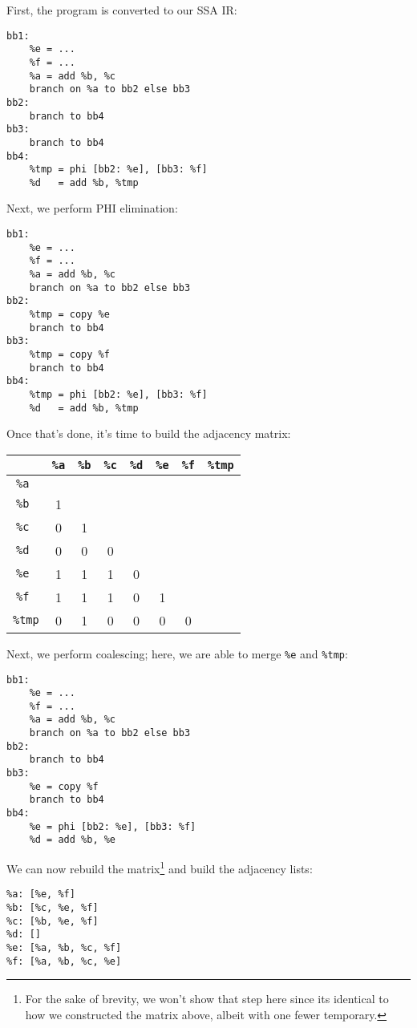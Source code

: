 \documentclass[12pt]{report}
\begin{document}
\noindent First, the program is converted to our SSA IR:
\begin{Verbatim}
bb1:
    %e = ...
    %f = ...
    %a = add %b, %c
    branch on %a to bb2 else bb3
bb2:
    branch to bb4
bb3:
    branch to bb4
bb4:
    %tmp = phi [bb2: %e], [bb3: %f]
    %d   = add %b, %tmp
\end{Verbatim}

\noindent Next, we perform PHI elimination:
\begin{Verbatim}
bb1:
    %e = ...
    %f = ...
    %a = add %b, %c
    branch on %a to bb2 else bb3
bb2:
    %tmp = copy %e
    branch to bb4
bb3:
    %tmp = copy %f
    branch to bb4
bb4:
    %tmp = phi [bb2: %e], [bb3: %f]
    %d   = add %b, %tmp
\end{Verbatim}

\noindent Once that's done, it's time to build the adjacency matrix:\medskip

\noindent\begin{tabular}{@{}c|ccccccc}
        &\tt\%a&\tt\%b&\tt\%c&\tt\%d&\tt\%e&\tt\%f&\tt\%tmp\\\hline
\tt\%a  &      &      &      &      &      &      &        \\
\tt\%b  &1     &      &      &      &      &      &        \\
\tt\%c  &0     &1     &      &      &      &      &        \\
\tt\%d  &0     &0     &0     &      &      &      &        \\
\tt\%e  &1     &1     &1     &0     &      &      &        \\
\tt\%f  &1     &1     &1     &0     &1     &      &        \\
\tt\%tmp&0     &1     &0     &0     &0     &0     &        \\
\end{tabular}\medskip

\noindent Next, we perform coalescing; here, we are able to merge \verb|%e| and \verb|%tmp|:
\begin{Verbatim}
bb1:
    %e = ...
    %f = ...
    %a = add %b, %c
    branch on %a to bb2 else bb3
bb2:
    branch to bb4
bb3:
    %e = copy %f
    branch to bb4
bb4:
    %e = phi [bb2: %e], [bb3: %f]
    %d = add %b, %e
\end{Verbatim}

\noindent We can now rebuild the matrix\footnote{For the sake of brevity, we won't show that step here since its identical to how we
constructed the matrix above, albeit with one fewer temporary.} and build the adjacency lists:
\begin{Verbatim}
%a: [%e, %f]
%b: [%c, %e, %f]
%c: [%b, %e, %f]
%d: []
%e: [%a, %b, %c, %f]
%f: [%a, %b, %c, %e]
\end{Verbatim}
\end{document}

